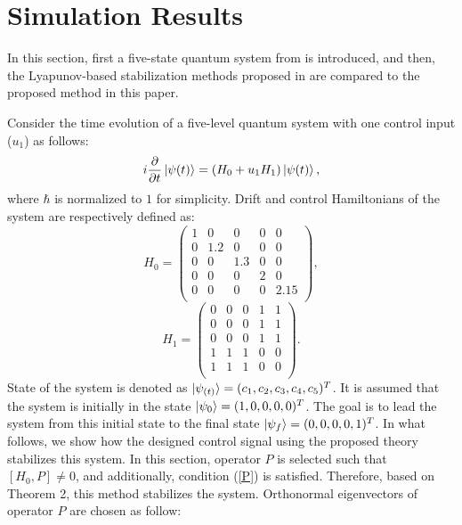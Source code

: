 \documentclass[journal]{IEEEtran}
\theoremstyle{definition}
\begin{document}
\section{Simulation Results}\label{results}
 
  In this section, first a five-state quantum system from \cite{tersigni1990using,kuang2008lyapunov} is introduced, and then, the Lyapunov-based stabilization methods proposed in \cite{grivopoulos2003lyapunov,mirrahimi2005lyapunov,shuang2007quantum} are compared to the proposed method in this paper.
  

Consider the time evolution of a five-level quantum system with one control input ($u_1$) as follows:  
\begin{equation}\label{system}
  i \frac{\partial }{\partial t}\ket{\psi{(t)}}= (H_0+u_1H_1)\ket{\psi{(t)}},
 \end{equation}
where $\hbar$ is normalized to $1$ for simplicity. Drift and control Hamiltonians of the system are respectively defined as:
  \begin{equation}\label{systemH0}
      H_0=\begin{pmatrix}
      1 & 0 & 0 & 0 & 0 \\
      0 & 1.2 & 0 & 0 & 0 \\ 
       0 & 0 & 1.3 & 0 & 0 \\
       0 & 0 & 0 & 2 & 0 \\
       0 & 0 & 0 & 0 & 2.15 \\
      \end{pmatrix},
  \end{equation}
  \begin{equation}\label{systemH1}
      H_1=\begin{pmatrix}
      0 & 0 & 0 & 1 & 1 \\
      0 & 0 & 0 & 1 & 1 \\ 
       0 & 0 & 0 & 1 & 1 \\
       1 & 1 & 1 & 0 & 0 \\
       1 & 1 & 1 & 0 & 0 \\
      \end{pmatrix}.
  \end{equation}
  State of the system is denoted as $\ket{\psi_{(t)}}=(c_1,c_2,c_3,c_4,c_5)^T$. It is assumed that the system is initially in the state $\ket{\psi_0}=(1,0,0,0,0)^T$. The goal is to lead the system from this initial state to the final state $\ket{\psi_f}=(0,0,0,0,1)^T$. In what follows, we show how the designed control signal using the proposed theory stabilizes this system. In this section, operator $P$ is selected such that $[H_0,P]\neq0$, and additionally, condition ({\ref{P}}) is satisfied. Therefore, based on Theorem 2, this method stabilizes the system. Orthonormal eigenvectors of operator $P$ are chosen as follow:
\end{document}
